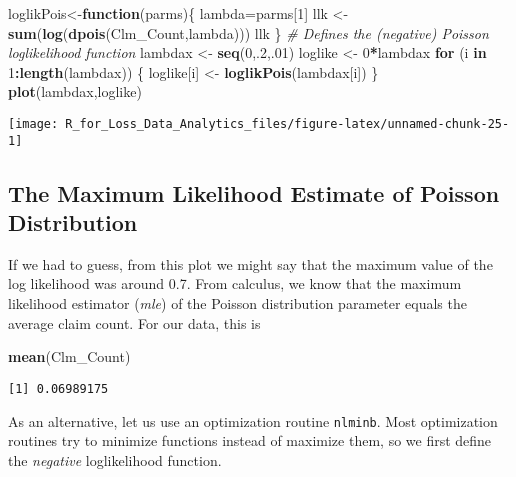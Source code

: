 \documentclass[]{book}
\newenvironment{Shaded}{\begin{snugshade}}{\end{snugshade}}
\newcommand{\KeywordTok}[1]{\textcolor[rgb]{0.13,0.29,0.53}{\textbf{#1}}}
\newcommand{\DecValTok}[1]{\textcolor[rgb]{0.00,0.00,0.81}{#1}}
\newcommand{\StringTok}[1]{\textcolor[rgb]{0.31,0.60,0.02}{#1}}
\newcommand{\CommentTok}[1]{\textcolor[rgb]{0.56,0.35,0.01}{\textit{#1}}}
\newcommand{\ControlFlowTok}[1]{\textcolor[rgb]{0.13,0.29,0.53}{\textbf{#1}}}
\newcommand{\OperatorTok}[1]{\textcolor[rgb]{0.81,0.36,0.00}{\textbf{#1}}}
\newcommand{\NormalTok}[1]{#1}
\theoremstyle{definition}
\theoremstyle{definition}
\theoremstyle{definition}
\theoremstyle{remark}
\begin{document}
\begin{Shaded}
\begin{Highlighting}[]
\NormalTok{loglikPois<-}\ControlFlowTok{function}\NormalTok{(parms)\{ }
\NormalTok{  lambda=parms[}\DecValTok{1}\NormalTok{]}
\NormalTok{  llk <-}\StringTok{ }\KeywordTok{sum}\NormalTok{(}\KeywordTok{log}\NormalTok{(}\KeywordTok{dpois}\NormalTok{(Clm_Count,lambda)))}
\NormalTok{  llk}
\NormalTok{\} }\CommentTok{# Defines the (negative) Poisson loglikelihood function}
\NormalTok{lambdax <-}\StringTok{ }\KeywordTok{seq}\NormalTok{(}\DecValTok{0}\NormalTok{,.}\DecValTok{2}\NormalTok{,.}\DecValTok{01}\NormalTok{)}
\NormalTok{loglike <-}\StringTok{ }\DecValTok{0}\OperatorTok{*}\NormalTok{lambdax}
\ControlFlowTok{for}\NormalTok{ (i }\ControlFlowTok{in} \DecValTok{1}\OperatorTok{:}\KeywordTok{length}\NormalTok{(lambdax)) }
\NormalTok{  \{}
\NormalTok{  loglike[i] <-}\StringTok{ }\KeywordTok{loglikPois}\NormalTok{(lambdax[i])}
\NormalTok{\}}
\KeywordTok{plot}\NormalTok{(lambdax,loglike)}
\end{Highlighting}
\end{Shaded}

\begin{center}\texttt{[image: R\_for\_Loss\_Data\_Analytics\_files/figure-latex/unnamed-chunk-25-1]} \end{center}

\subsection{The Maximum Likelihood Estimate of Poisson
Distribution}\label{the-maximum-likelihood-estimate-of-poisson-distribution}

If we had to guess, from this plot we might say that the maximum value
of the log likelihood was around 0.7. From calculus, we know that the
maximum likelihood estimator (\emph{mle}) of the Poisson distribution
parameter equals the average claim count. For our data, this is

\begin{Shaded}
\begin{Highlighting}[]
\KeywordTok{mean}\NormalTok{(Clm_Count)}
\end{Highlighting}
\end{Shaded}

\begin{verbatim}
[1] 0.06989175
\end{verbatim}

As an alternative, let us use an optimization routine \texttt{nlminb}.
Most optimization routines try to minimize functions instead of maximize
them, so we first define the \emph{negative} loglikelihood function.
\end{document}
